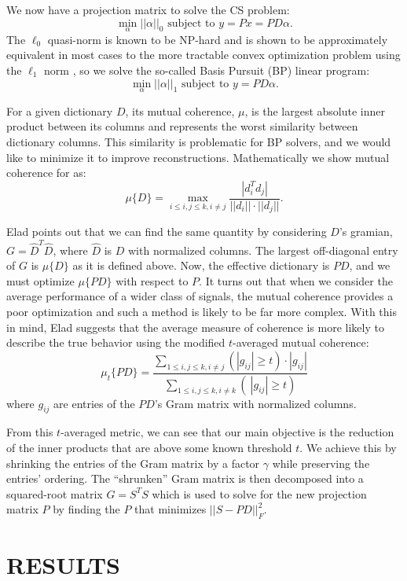 \documentclass[journal]{IEEEtran}
\begin{document}
We now have a projection matrix to solve the CS problem: $$ \min_\alpha ||\alpha||_0 \mbox{ subject to } y = Px = PD\alpha.$$  The $\ell_0$ quasi-norm is known to be NP-hard and is shown to be approximately equivalent in most cases to the more tractable convex optimization problem using the $\ell_1$ norm \cite{convexoptimization}, so we solve the so-called Basis Pursuit (BP) linear program: $$ \min_\alpha ||\alpha||_1 \mbox{ subject to } y = PD\alpha .$$

For a given dictionary $D$, its mutual coherence, $\mu$, is the largest absolute inner product between its columns and represents the worst similarity between dictionary columns.  This similarity is problematic for BP solvers, and we would like to minimize it to improve reconstructions.  Mathematically we show mutual coherence for  as: $$ \mu\{D\} = \max_{i \leq i,j \leq k, i \neq j} \frac{| d_i^Td_j |}{|| d_i || \cdot || d_j ||}. $$

Elad points out that we can find the same quantity by considering $D$'s gramian, $G = \hat{D}^T \hat{D}$, where $\hat{D}$ is $D$ with normalized columns.  The largest off-diagonal entry of $G$ is $\mu\{D\}$ as it is defined above.  Now, the effective dictionary is $PD$, and we must optimize $\mu\{PD\}$ with respect to $P$.  It turns out that when we consider the average performance of a wider class of signals, the mutual coherence provides a poor optimization and such a method is likely to be far more complex.  With this in mind, Elad suggests that the average measure of coherence is more likely to describe the true behavior using the modified $t$-averaged mutual coherence: $$ \mu_t\{PD\} = \frac{ \sum_{1 \leq i,j \leq k, i \neq j} (| g_{ij} | \geq t) \cdot | g_{ij} | }{ \sum_{1 \leq i,j \leq k, i \neq k} (\ | g_{ij} | \geq t)} $$ where $g_{ij}$ are entries of the $PD$'s Gram matrix with normalized columns.

From this $t$-averaged metric, we can see that our main objective is the reduction of the inner products that are above some known threshold $t$.  We achieve this by shrinking the entries of the Gram matrix by a factor $\gamma$ while preserving the entries' ordering.  The ``shrunken'' Gram matrix is then decomposed into a squared-root matrix $G = S^TS$ which is used to solve for the new projection matrix $P$ by finding the $P$ that minimizes $ || S - PD ||_F^2 $.

\section{RESULTS}
\end{document}
